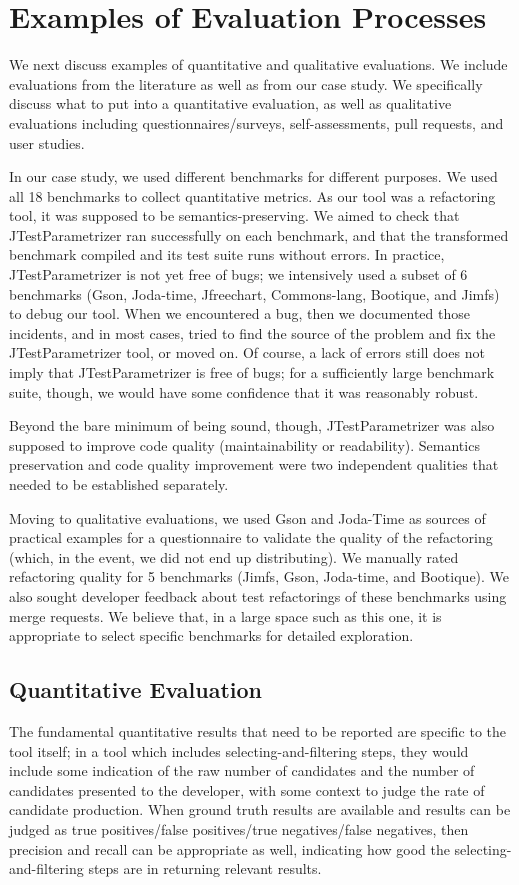 \section{Examples of Evaluation Processes}
\label{sec:our-evaluation-process}

We next discuss examples of quantitative and qualitative
evaluations. We include evaluations from the literature as well as
from our case study. We specifically discuss what to put into
a quantitative evaluation, as well as qualitative evaluations
including questionnaires/surveys, self-assessments, pull requests,
and user studies.

In our case study, we used different benchmarks for
different purposes. We used all 18 benchmarks to collect quantitative
metrics. As our tool was a refactoring tool, it was supposed to be
semantics-preserving. We aimed to check that JTestParametrizer ran
successfully on each benchmark, and that the transformed benchmark
compiled and its test suite runs without errors.  In practice,
JTestParametrizer is not yet free of bugs; we intensively used a
subset of 6 benchmarks (Gson, Joda-time, Jfreechart, Commons-lang,
Bootique, and Jimfs) to debug our tool.  When we encountered a bug,
then we documented those incidents, and in most cases, tried to find
the source of the problem and fix the JTestParametrizer tool, or moved
on. Of course, a lack of errors still does not imply that
JTestParametrizer is free of bugs; for a sufficiently large benchmark suite,
though, we would have some confidence that it was reasonably robust.

Beyond the bare minimum of being sound, though, JTestParametrizer was
also supposed to improve code quality (maintainability or
readability). Semantics preservation and code quality improvement were
two independent qualities that needed to be established separately.

Moving to qualitative evaluations, we used Gson and Joda-Time as
sources of practical examples for a questionnaire to validate the
quality of the refactoring (which, in the event, we did not end up
distributing).  We manually rated refactoring quality for 5 benchmarks
(Jimfs, Gson, Joda-time, and Bootique). We also sought developer
feedback about test refactorings of these benchmarks using merge
requests.  We believe that, in a large space such as this one, it is
appropriate to select specific benchmarks for detailed exploration.

\subsection{Quantitative Evaluation}
The fundamental quantitative results that need to be reported are
specific to the tool itself; in a tool which includes selecting-and-filtering
steps, they would include some indication of the raw number of candidates
and the number of candidates presented to the developer, with some 
context to judge the rate of candidate production. When ground truth 
results are available and results can be judged as true positives/false positives/true negatives/false negatives,
then precision and recall can be appropriate as well, indicating how good
the selecting-and-filtering steps are in returning relevant results.

